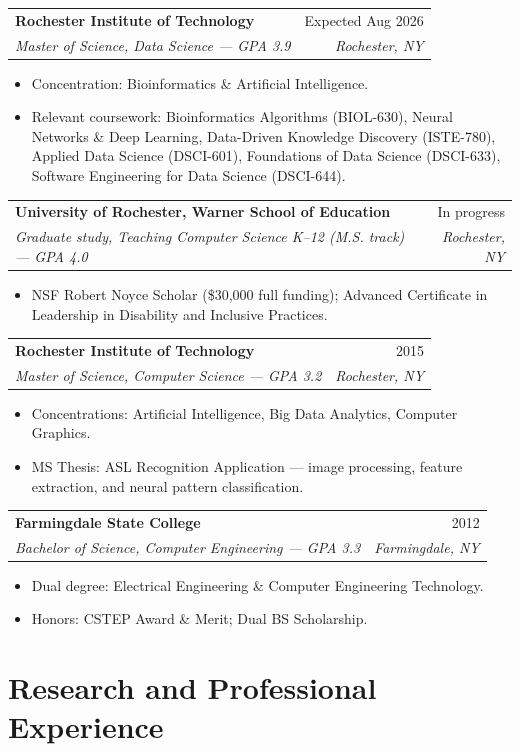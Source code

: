 \documentclass[11pt]{article}
\makeatletter
\newcommand{\entry}[4]{
  \noindent\begin{tabularx}{\textwidth}{@{}Xr@{}}
    \textbf{#1} & #2 \\
    \textit{#3} & \textit{#4}
  \end{tabularx}\vspace{2pt}
}
\makeatother
\begin{document}
\entry{Rochester Institute of Technology}{Expected Aug 2026}{Master of Science, Data Science --- GPA 3.9}{Rochester, NY}
\begin{itemize}
  \item Concentration: Bioinformatics \& Artificial Intelligence.
  \item Relevant coursework: Bioinformatics Algorithms (BIOL-630), Neural Networks \& Deep Learning, Data-Driven Knowledge Discovery (ISTE-780), Applied Data Science (DSCI-601), Foundations of Data Science (DSCI-633), Software Engineering for Data Science (DSCI-644).
\end{itemize}

\entry{University of Rochester, Warner School of Education}{In progress}{Graduate study, Teaching Computer Science K--12 (M.S. track) --- GPA 4.0}{Rochester, NY}
\begin{itemize}
  \item NSF Robert Noyce Scholar (\$30,000 full funding); Advanced Certificate in Leadership in Disability and Inclusive Practices.
\end{itemize}

\entry{Rochester Institute of Technology}{2015}{Master of Science, Computer Science --- GPA 3.2}{Rochester, NY}
\begin{itemize}
  \item Concentrations: Artificial Intelligence, Big Data Analytics, Computer Graphics.
  \item MS Thesis: ASL Recognition Application --- image processing, feature extraction, and neural pattern classification.
\end{itemize}

\entry{Farmingdale State College}{2012}{Bachelor of Science, Computer Engineering --- GPA 3.3}{Farmingdale, NY}
\begin{itemize}
  \item Dual degree: Electrical Engineering \& Computer Engineering Technology.
  \item Honors: CSTEP Award \& Merit; Dual BS Scholarship.
\end{itemize}

\section{Research and Professional Experience}
\end{document}
